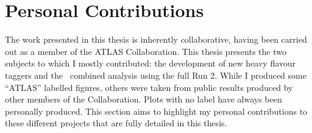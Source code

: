 \chapter*{\color{oxfordblue} Personal Contributions}

The work presented in this thesis is inherently collaborative, having been carried out as a member of the ATLAS Collaboration. This thesis presents the two subjects to which I mostly contributed: the development of new heavy flavour taggers and the \vhbc\ combined analysis using the full Run 2. While I produced some ``ATLAS'' labelled figures, others were taken from public results produced by other members of the Collaboration. Plots with no label have always been personally produced. This section aims to highlight my personal contributions to these different projects that are fully detailed in this thesis.

